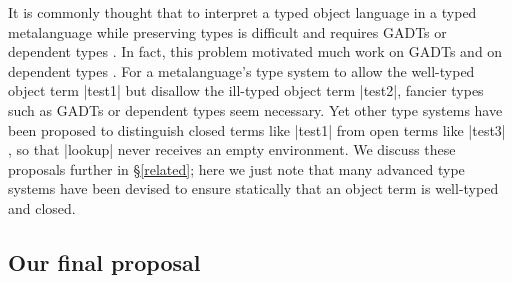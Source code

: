 It is commonly thought that to interpret a typed object language in
a typed metalanguage while preserving types is difficult and requires
GADTs or dependent types \citep{taha-tag}.  In fact, this problem
motivated much work on GADTs \cite{xi-guarded,peyton-jones-simple} and
on dependent types \cite{WalidICFP02,fogarty-concoqtion}.
\ifshort\else
For a metalanguage's type system to allow the well-typed object term
|test1| but disallow the ill-typed object term |test2|, fancier types
such as GADTs or dependent types seem necessary.  
\fi
Yet other type systems
have been proposed to distinguish closed terms like |test1| from open
terms 
\ifshort\cite{WalidPOPL03,NanevskiJFP05,DaviesJACM01}\else
like |test3|
\cite{WalidPOPL03,NanevskiICFP02,NanevskiJFP05,DaviesJACM01,nanevski-contextual}\fi,
so that |lookup| never receives an empty environment.  We discuss these
proposals further in \S\ref{related}\ifshort\else;
here we just note that many
advanced type systems have been devised to ensure statically that an
object term is well-typed and closed\fi.

\subsection{Our final proposal}\label{ourapproach}

